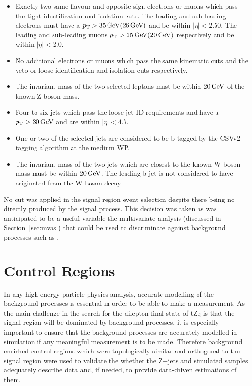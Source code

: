 \begin{itemize}
\item Exactly two same flavour and opposite sign electrons or muons which pass the tight identification and isolation cuts. The leading and sub-leading electrons must have a $p_{\mathrm{T}} > 35\,\text{Ge\hspace{-.08em}V} (26\,\text{Ge\hspace{-.08em}V})$ and be within $|\eta| < 2.50$. The leading and sub-leading muons $p_{\mathrm{T}} > 15\,\text{Ge\hspace{-.08em}V} (20\,\text{Ge\hspace{-.08em}V})$ respectively and be within $|\eta| < 2.0$.
\item No additional electrons or muons which pass the same kinematic cuts and the veto or loose identification and isolation cuts respectively. 
\item The invariant mass of the two selected leptons must be within $20\,\text{Ge\hspace{-.08em}V}$ of the known Z boson mass.
\item Four to six jets which pass the loose jet ID requirements and have a $p_{\mathrm{T}} > 30\,\text{Ge\hspace{-.08em}V}$ and are within $|\eta| < 4.7$.
\item One or two of the selected jets are considered to be b-tagged by the CSVv2 tagging algorithm at the medium WP.
\item The invariant mass of the two jets which are closest to the known W boson mass must be within $20\,\text{Ge\hspace{-.08em}V}$. The leading b-jet is not considered to have originated from the W boson decay.
\end{itemize}

No \MET cut was applied in the signal region event selection despite there being no \MET directly produced by the signal process.
This decision was taken as \MET was anticipated to be a useful variable the multivariate analysis (discussed in Section~\ref{sec:mvas}) that could be used to discriminate against background processes such as \ttbar.

\section{Control Regions}\label{sec:controlRegions}
In any high energy particle physics analysis, accurate modelling of the background processes is essential in order to be able to make a measurement.
As the main challenge in the search for the dilepton final state of tZq is that the signal region will be dominated by background processes, it is especially important to ensure that the background processes are accurately modelled in simulation if any meaningful measurement is to be made.
Therefore background enriched control regions which were topologically similar and orthogonal to the signal region were used to validate the whether the Z+jets and \ttbar simulated samples adequately describe data and, if needed, to provide data-driven estimations of them.

